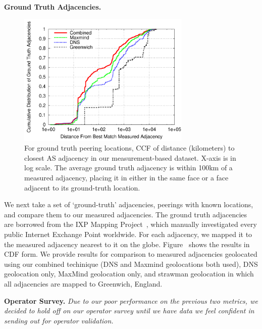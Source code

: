            {\bf Ground Truth Adjacencies.}
\begin{figure}[tb]
\centering
\includegraphics[width=3.25in]{graph_all_match}
\caption[]{\label{fig:closestadjacency} For ground truth peering locations, CCF of distance (kilometers) to closest AS adjacency in our measurement-based dataset. X-axis is in log scale. The average ground truth adjacency is within 100km of a measured adjacency, placing it in either in the same face or a face adjacent to its ground-truth location.} 
\end{figure}
            We next take a set of `ground-truth' adjacencies, peerings with known locations, and compare them to our measured adjacencies. 
           The ground truth adjacencies are borrowed from the IXP Mapping Project~\cite{ixps-mapped}, which manually investigated every public Internet Exchange Point worldwide.
            For each adjacency, we mapped it to the measured adjacency nearest to it on the globe.
            Figure~\cite{fig:closestadjacency} shows the results in CDF form.
            We provide results for comparison to measured adjacencies geolocated using our combined techinique (DNS and Maxmind geolocations both used), DNS geolocation only, MaxMind geolocation only, and strawman geolocation in which all adjacencies are mapped to Greenwich, England.




            {\bf Operator Survey.} {\it Due to our poor performance on the previous two metrics, we decided to hold off on our operator survey until we have data we feel confident in sending out for operator validation.}



